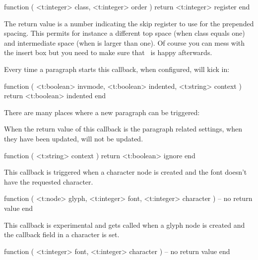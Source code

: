 \starttyping[option=LUA]
function (
    <t:integer> class,
    <t:integer> order
)
    return <t:integer> register
end
\stoptyping

The return value is a number indicating the skip register to use for the
prepended spacing. This permits for instance a different top space (when \type
{class} equals one) and intermediate space (when  is larger than
one). Of course you can mess with the insert box but you need to make sure that
\LUATEX\ is happy afterwards.

\stopsubsection

\startsubsection[title=begin_paragraph]

Every time a paragraph starts this callback, when configured, will kick in:

\starttyping[option=LUA]
function (
    <t:boolean> invmode,
    <t:boolean> indented,
    <t:string>  context
)
    return <t:boolean> indented
end
\stoptyping

There are many places where a new paragraph can be triggered:

\startfourrows
{}
\stopfourrows

\stopsubsection

\startsubsection[title=paragraph_context]

When the return value of this callback is  the paragraph related
settings, when they have been updated, will not be updated.

\starttyping[option=LUA]
function (
    <t:string> context
)
    return <t:boolean> ignore
end
\stoptyping

\stopsubsection

\startsubsection[title=missing_character]

This callback is triggered when a character node is created and the font doesn't
have the requested character.

\starttyping[option=LUA]
function (
    <t:node>    glyph,
    <t:integer> font,
    <t:integer> character
)
    -- no return value
end
\stoptyping

\stopsubsection

\startsubsection[title=process_character]

This callback is experimental and gets called when a glyph node is created and
the callback field in a character is set.

\starttyping[option=LUA]
function (
    <t:integer> font,
    <t:integer> character
)
    -- no return value
end
\stoptyping


